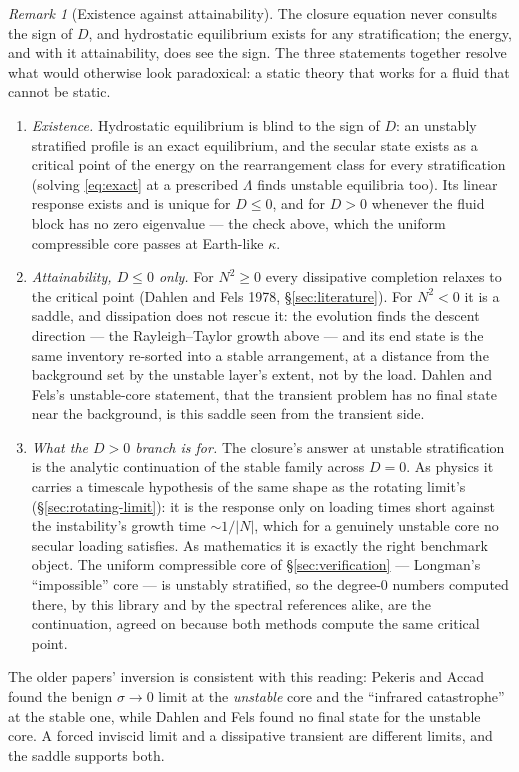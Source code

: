 \documentclass[11pt]{article}
\theoremstyle{definition}
\theoremstyle{remark}
\newtheorem{remark}{Remark}
\begin{document}
\begin{remark}[Existence against attainability]
\label{rem:attainability}
The closure equation never consults the sign of $D$, and hydrostatic
equilibrium exists for any stratification; the energy, and with it
attainability, does see the sign. The three statements together
resolve what would otherwise look paradoxical: a static theory that
works for a fluid that cannot be static.
\begin{enumerate}
\item \emph{Existence.} Hydrostatic equilibrium is blind to the sign of
  $D$: an unstably stratified profile is an exact equilibrium, and the
  secular state exists as a critical point of the energy on the
  rearrangement class for every stratification (solving
  \eqref{eq:exact} at a prescribed $\Lambda$ finds unstable equilibria
  too). Its linear response exists and is unique for $D \le 0$, and for
  $D > 0$ whenever the fluid block has no zero eigenvalue --- the check
  above, which the uniform compressible core passes at Earth-like
  $\kappa$.
\item \emph{Attainability, $D \le 0$ only.} For $N^2 \ge 0$ every
  dissipative completion relaxes to the critical point (Dahlen and
  Fels 1978, \S\ref{sec:literature}). For $N^2 < 0$ it is a saddle, and
  dissipation does not rescue it: the evolution finds the descent
  direction --- the Rayleigh--Taylor growth above --- and its end state
  is the same inventory re-sorted into a stable arrangement, at a
  distance from the background set by the unstable layer's extent, not
  by the load. Dahlen and Fels's unstable-core statement, that the
  transient problem has no final state near the background, is this
  saddle seen from the transient side.
\item \emph{What the $D > 0$ branch is for.} The closure's answer at
  unstable stratification is the analytic continuation of the stable
  family across $D = 0$. As physics it carries a timescale hypothesis
  of the same shape as the rotating limit's
  (\S\ref{sec:rotating-limit}): it is the response only on loading times
  short against the instability's growth time $\sim 1/|N|$, which for a
  genuinely unstable core no secular loading satisfies. As mathematics
  it is exactly the right benchmark object. The uniform compressible
  core of \S\ref{sec:verification} --- Longman's ``impossible'' core ---
  is unstably stratified, so the degree-0 numbers computed there, by
  this library and by the spectral references alike, are the
  continuation, agreed on because both methods compute the same
  critical point.
\end{enumerate}
The older papers' inversion is consistent with this reading: Pekeris
and Accad found the benign $\sigma \to 0$ limit at the \emph{unstable}
core and the ``infrared catastrophe'' at the stable one, while Dahlen
and Fels found no final state for the unstable core. A forced inviscid
limit and a dissipative transient are different limits, and the saddle
supports both.
\end{remark}
\end{document}
